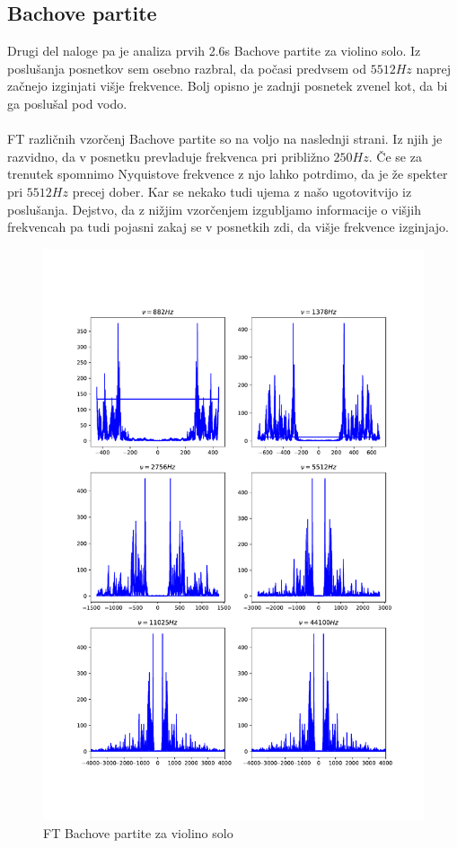\documentclass{article}
\begin{document}
\subsection{Bachove partite}
Drugi del naloge pa je analiza prvih 2.6s Bachove partite za violino solo. Iz poslušanja posnetkov sem osebno razbral, da počasi predvsem od $5512Hz$ naprej začnejo izginjati višje frekvence. Bolj opisno je zadnji posnetek zvenel kot, da bi ga poslušal pod vodo. 
\\\\
FT različnih vzorčenj Bachove partite so na voljo na naslednji strani. Iz njih je razvidno, da v posnetku prevladuje frekvenca pri približno $250Hz$. Če se za trenutek spomnimo Nyquistove frekvence z njo lahko potrdimo, da je že spekter pri $5512Hz$ precej dober. Kar se nekako tudi ujema z našo ugotovitvijo iz poslušanja. Dejstvo, da z nižjim vzorčenjem izgubljamo informacije o višjih frekvencah pa tudi pojasni zakaj se v posnetkih zdi, da višje frekvence izginjajo. 
\begin{figure}[H]
    \centering
	\includegraphics[width=1\textwidth]{bach.pdf}
	\caption{FT Bachove partite za violino solo}
\end{figure}
\end{document}
